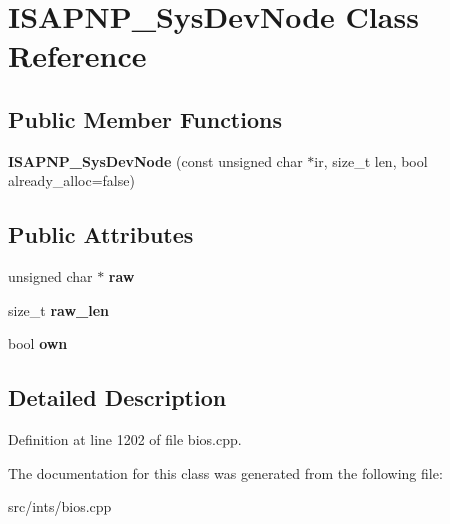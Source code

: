 \hypertarget{classISAPNP__SysDevNode}{\section{I\-S\-A\-P\-N\-P\-\_\-\-Sys\-Dev\-Node Class Reference}
\label{classISAPNP__SysDevNode}
}
\subsection*{Public Member Functions}
\begin{DoxyCompactItemize}
\item 
\hypertarget{classISAPNP__SysDevNode_a08b686d61113d6cd7a7783568515481f}{{\bfseries I\-S\-A\-P\-N\-P\-\_\-\-Sys\-Dev\-Node} (const unsigned char $\ast$ir, size\-\_\-t len, bool already\-\_\-alloc=false)}\label{classISAPNP__SysDevNode_a08b686d61113d6cd7a7783568515481f}

\end{DoxyCompactItemize}
\subsection*{Public Attributes}
\begin{DoxyCompactItemize}
\item 
\hypertarget{classISAPNP__SysDevNode_a88b23d674e4b48999a46d838dff47b7b}{unsigned char $\ast$ {\bfseries raw}}\label{classISAPNP__SysDevNode_a88b23d674e4b48999a46d838dff47b7b}

\item 
\hypertarget{classISAPNP__SysDevNode_a599de9be7c4895bfc76204eed3743fe4}{size\-\_\-t {\bfseries raw\-\_\-len}}\label{classISAPNP__SysDevNode_a599de9be7c4895bfc76204eed3743fe4}

\item 
\hypertarget{classISAPNP__SysDevNode_a0a342171b0ed0789f665868c14e9e6cc}{bool {\bfseries own}}\label{classISAPNP__SysDevNode_a0a342171b0ed0789f665868c14e9e6cc}

\end{DoxyCompactItemize}


\subsection{Detailed Description}


Definition at line 1202 of file bios.\-cpp.



The documentation for this class was generated from the following file\-:\begin{DoxyCompactItemize}
\item 
src/ints/bios.\-cpp\end{DoxyCompactItemize}
